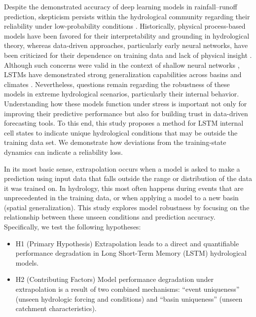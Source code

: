\documentclass{article}
\begin{document}
Despite the demonstrated accuracy of deep learning models in rainfall–runoff prediction, skepticism persists within the hydrological community regarding their reliability under low-probability conditions \cite{frame2022extreme}. Historically, physical process-based models have been favored for their interpretability and grounding in hydrological theory, whereas data-driven approaches, particularly early neural networks, have been criticized for their dependence on training data and lack of physical insight \cite{Todini2007, Sellars2018}. Although such concerns were valid in the context of shallow neural networks \cite{Cameron2002, Gaume2003}, LSTMs have demonstrated strong generalization capabilities across basins and climates \cite{Kratzert2019pub}. Nevertheless, questions remain regarding the robustness of these models in extreme hydrological scenarios, particularly their internal behavior. Understanding how these models function under stress is important not only for improving their predictive performance but also for building trust in data-driven forecasting tools. To this end, this study proposes a method for LSTM internal cell states to indicate unique hydrological conditions that may be outside the training data set. We demonstrate how deviations from the training-state dynamics can indicate a reliability loss.

In its most basic sense, extrapolation occurs when a model is asked to make a prediction using input data that falls outside the range or distribution of the data it was trained on. In hydrology, this most often happens during events that are unprecedented in the training data, or when applying a model to a new basin (spatial generalization). This study explores model robustness by focusing on the relationship between these unseen conditions and prediction accuracy. Specifically, we test the following hypotheses: 

\begin{itemize} 
\item H1 (Primary Hypothesis) Extrapolation leads to a direct and quantifiable performance degradation in Long Short-Term Memory (LSTM) hydrological models. 
\item H2 (Contributing Factors) Model performance degradation under extrapolation is a result of two combined mechanisms: ``event uniqueness'' (unseen hydrologic forcing and conditions) and ``basin uniqueness'' (unseen catchment characteristics). 
\end{itemize}
\end{document}
